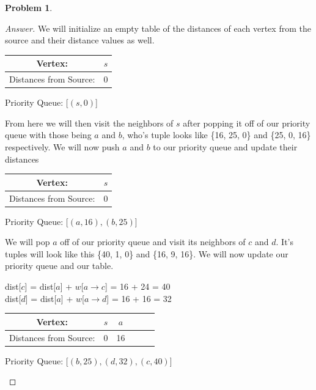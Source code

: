 \documentclass[11pt]{article}
\theoremstyle{definition}
\theoremstyle{definition}
\newtheorem{required}{Problem}
\theoremstyle{definition}
\begin{document}
\begin{required}
\begin{enumerate}[label=(\alph*)]
\begin{proof}[Answer]
We will initialize an empty table of the distances of each vertex from the source and their distance values as well. \\
\begin{center}
\begin{tabular}{ | c | c |}
 \hline
 Vertex:& $s$ \\ 
 \hline
 Distances from Source:& 0 \\  
 \hline
\end{tabular}
\end{center}
\begin{center}
Priority Queue: [$(s, 0)$]
\end{center}
From here we will then visit the neighbors of $s$ after popping it off of our priority queue with those being $a$ and $b$, who's tuple looks like \{16, 25, 0\} and \{25, 0, 16\} respectively. We will now push $a$ and $b$ to our priority queue and update their distances \\
\begin{center}
\begin{tabular}{ | c | c | }
 \hline
 Vertex:& $s$\\ 
 \hline
 Distances from Source:& 0 \\  
 \hline
\end{tabular}
\end{center}
\begin{center}
Priority Queue: [$(a, 16), (b, 25)$]
\end{center}
We will pop $a$ off of our priority queue and visit its neighbors of $c$ and $d$. It's tuples will look like this \{40, 1, 0\} and \{16, 9, 16\}. We will now update our priority queue and our table. \\
\begin{center}
dist[$c$] = dist[$a$]  + $w$[$a \rightarrow c$] = 16 + 24 = 40 \\
dist[$d$] = dist[$a$] + $w$[$a \rightarrow d$] = 16 + 16 = 32\\

\begin{tabular}{ | c | c | c | c | c | c |}
 \hline
 Vertex:& $s$ & $a$\\ 
 \hline
 Distances from Source:& 0 & 16 \\  
 \hline
\end{tabular}
\end{center}
\begin{center}
Priority Queue: [$(b, 25), (d, 32), (c, 40)$]
\end{center}


\end{proof}
\end{enumerate}
\end{required}
\end{document}
